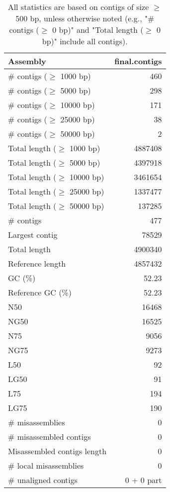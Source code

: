 \documentclass[12pt,a4paper]{article}
\begin{document}
\begin{table}[ht]
\begin{center}
\caption{All statistics are based on contigs of size $\geq$ 500 bp, unless otherwise noted (e.g., "\# contigs ($\geq$ 0 bp)" and "Total length ($\geq$ 0 bp)" include all contigs).}
\begin{tabular}{|l*{1}{|r}|}
\hline
Assembly & final.contigs \\ \hline
\# contigs ($\geq$ 1000 bp) & 460 \\ \hline
\# contigs ($\geq$ 5000 bp) & 298 \\ \hline
\# contigs ($\geq$ 10000 bp) & 171 \\ \hline
\# contigs ($\geq$ 25000 bp) & 38 \\ \hline
\# contigs ($\geq$ 50000 bp) & 2 \\ \hline
Total length ($\geq$ 1000 bp) & 4887408 \\ \hline
Total length ($\geq$ 5000 bp) & 4397918 \\ \hline
Total length ($\geq$ 10000 bp) & 3461654 \\ \hline
Total length ($\geq$ 25000 bp) & 1337477 \\ \hline
Total length ($\geq$ 50000 bp) & 137285 \\ \hline
\# contigs & 477 \\ \hline
Largest contig & 78529 \\ \hline
Total length & 4900340 \\ \hline
Reference length & 4857432 \\ \hline
GC (\%) & 52.23 \\ \hline
Reference GC (\%) & 52.23 \\ \hline
N50 & 16468 \\ \hline
NG50 & 16525 \\ \hline
N75 & 9056 \\ \hline
NG75 & 9273 \\ \hline
L50 & 92 \\ \hline
LG50 & 91 \\ \hline
L75 & 194 \\ \hline
LG75 & 190 \\ \hline
\# misassemblies & 0 \\ \hline
\# misassembled contigs & 0 \\ \hline
Misassembled contigs length & 0 \\ \hline
\# local misassemblies & 0 \\ \hline
\# unaligned contigs & 0 + 0 part \\ \hline

\end{tabular}
\end{center}
\end{table}
\end{document}
